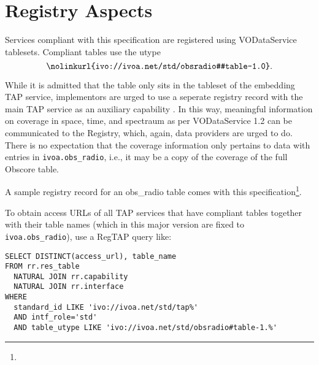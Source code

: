 \documentclass[11pt,a4paper]{ivoa}
\begin{document}
\section{Registry Aspects}
\label{sec:registry}

Services compliant with this specification are registered using
VODataService \citep{2021ivoa.spec.1102D} tablesets.  Compliant tables
use the utype
$$
\hbox{\nolinkurl{ivo://ivoa.net/std/obsradio#table-1.0}.}
$$

While it is admitted that the table only sits in the tableset of the
embedding TAP service, implementors are urged to use a seperate registry
record with the main TAP service as an auxiliary capability
\citep{2019ivoa.spec.0520D}.  In this way, meaningful information
on coverage in space, time, and spectraum as per VODataService 1.2 can
be communicated to the Registry, which, again, data providers are urged
to do.  There is no expectation that the coverage information only
pertains to data with entries in \verb|ivoa.obs_radio|, i.e., it may be
a copy of the coverage of the full Obscore table.

A sample registry record for an obs\_radio table comes with this
specification\footnote{}.

To obtain access URLs of all TAP services that have compliant tables
together with their table names (which in this major version are fixed
to \verb|ivoa.obs_radio|), use a RegTAP \citep{2019ivoa.spec.1011D}
query like:

\begin{lstlisting}
SELECT DISTINCT(access_url), table_name
FROM rr.res_table
  NATURAL JOIN rr.capability
  NATURAL JOIN rr.interface
WHERE
  standard_id LIKE 'ivo://ivoa.net/std/tap%'
  AND intf_role='std'
  AND table_utype LIKE 'ivo://ivoa.net/std/obsradio#table-1.%'
\end{lstlisting}

\appendix





\end{document}
